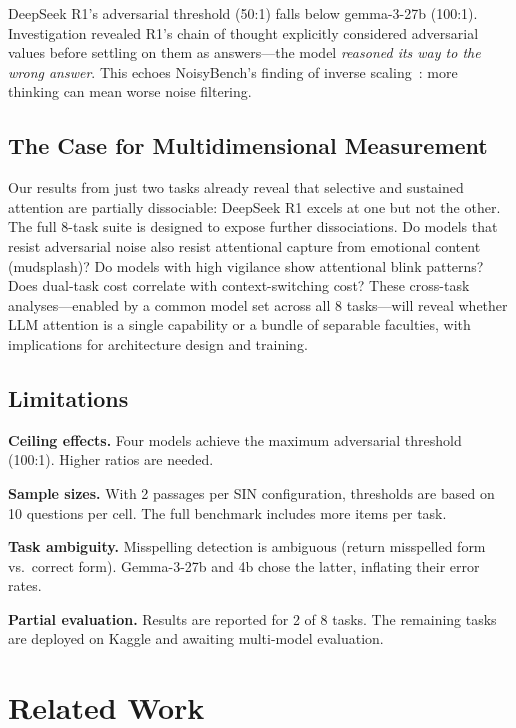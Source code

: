 \documentclass[11pt,twocolumn]{article}
\begin{document}
DeepSeek R1's adversarial threshold (50:1) falls below gemma-3-27b (100:1). Investigation revealed R1's chain of thought explicitly considered adversarial values before settling on them as answers---the model \emph{reasoned its way to the wrong answer}. This echoes NoisyBench's finding of inverse scaling~\citep{noisybench2026}: more thinking can mean worse noise filtering.

\subsection{The Case for Multidimensional Measurement}

Our results from just two tasks already reveal that selective and sustained attention are partially dissociable: DeepSeek R1 excels at one but not the other. The full 8-task suite is designed to expose further dissociations. Do models that resist adversarial noise also resist attentional capture from emotional content (mudsplash)? Do models with high vigilance show attentional blink patterns? Does dual-task cost correlate with context-switching cost? These cross-task analyses---enabled by a common model set across all 8 tasks---will reveal whether LLM attention is a single capability or a bundle of separable faculties, with implications for architecture design and training.

\subsection{Limitations}
\label{sec:limitations}

\textbf{Ceiling effects.} Four models achieve the maximum adversarial threshold (100:1). Higher ratios are needed.

\textbf{Sample sizes.} With 2 passages per SIN configuration, thresholds are based on 10 questions per cell. The full benchmark includes more items per task.

\textbf{Task ambiguity.} Misspelling detection is ambiguous (return misspelled form vs.\ correct form). Gemma-3-27b and 4b chose the latter, inflating their error rates.

\textbf{Partial evaluation.} Results are reported for 2 of 8 tasks. The remaining tasks are deployed on Kaggle and awaiting multi-model evaluation.

\section{Related Work}
\end{document}
